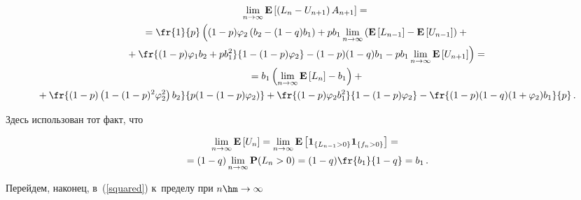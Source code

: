 \begin{multline*}

\lim\limits_{n\to\infty}\mathbf{E}\left[\left(L_n-U_{n+1}\right)A_{n+1}\right]={}\\

{}=

\fr{1}{p}\left(

\vphantom{\fr{(1-p)\varphi_1 b_2+pb_1^2}{1-(1-p)\varphi_2}}

(1-p)\varphi_2\left(b_2-(1-q)b_1\right)+

pb_1\lim\limits_{n\to\infty}\left(\mathbf{E}\left[L_{n-1}\right]-

\mathbf{E}\left[U_{n-1}\right]\right)+{}\right.\\

\left.{}+\fr{(1-p)\varphi_1 b_2+pb_1^2}{1-(1-p)\varphi_2}-

(1-p)(1-q)b_1-pb_1\lim\limits_{n\to\infty}

\mathbf{E}\left[U_{n+1}\right]\right)={}\\

{}=

b_1\left(\lim\limits_{n\to\infty}\mathbf{E}\left[L_n\right]-b_1\right)+{}\\

{}+\fr{(1-p)\left(1-(1-p)^2\varphi_2^2\right)b_2}

{p(1-(1-p)\varphi_2)}+\fr{(1-p)\varphi_2 b_1^2}{1-(1-p)\varphi_2}-

\fr{(1-p)(1-q)(1+\varphi_2)b_1}{p}\,.

\end{multline*}

Здесь использован тот факт, что



\noindent

\begin{multline*}

\lim\limits_{n\to\infty}\mathbf{E}\left[U_n\right]=

\lim\limits_{n\to\infty}\mathbf{E}\left[\mathbf{1}_{\{L_{n-1}>0\}}

\mathbf{1}_{\{f_{n}>0\}}\right]={}\\

{}=

(1-q)\lim\limits_{n\to\infty}\mathbf{P}(L_n>0)=(1-q)\fr{b_1}{1-q}=b_1\,.

\end{multline*}



Перейдем, наконец, в~(\ref{squared}) к~пределу при $n\hm\to\infty$

